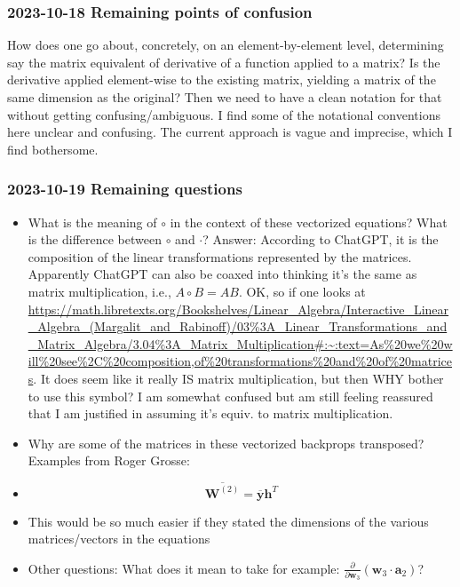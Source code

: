 \documentclass{article}
\begin{document}
\subsubsection{2023-10-18 Remaining points of confusion} How does one go about, concretely, on an element-by-element
level, determining say the matrix equivalent of derivative of a function applied to a matrix? 
Is the derivative applied element-wise to the existing matrix, yielding a matrix of the same dimension as the original?
Then we need to have a clean notation for that without getting confusing/ambiguous. I find some of the notational
conventions here unclear and confusing. The current approach is vague and imprecise, which I find bothersome.
\subsubsection{2023-10-19 Remaining questions}
\begin{itemize}
    \item What is the meaning of $\circ$ in the context of these vectorized equations? What is the difference between $\circ$ and $\cdot$?
    Answer: According to ChatGPT, it is the composition of the linear transformations represented by the matrices.
    Apparently ChatGPT can also be coaxed into thinking it's the same as matrix multiplication, i.e., $A \circ B = AB$.
    OK, so if one looks at  \url{https://math.libretexts.org/Bookshelves/Linear_Algebra/Interactive_Linear_Algebra_(Margalit_and_Rabinoff)/03%3A_Linear_Transformations_and_Matrix_Algebra/3.04%3A_Matrix_Multiplication#:~:text=As%20we%20will%20see%2C%20composition,of%20transformations%20and%20of%20matrices}.
    It does seem like it really IS matrix multiplication, but then WHY bother to use this symbol? I am somewhat confused but am still feeling reassured that 
    I am justified in assuming it's equiv. to matrix multiplication.
    \item Why are some of the matrices in these vectorized backprops transposed? Examples from Roger Grosse:
    \item \[ \overline{\bm{W}^{(2)}} = \overline{\bm{y}}\bm{h}^{T} \]
    \item This would be so much easier if they stated the dimensions of the various matrices/vectors in the equations
    \item Other questions: What does it mean to take for example: $\frac{\partial}{\partial{\bm{w}_3}} (\bm{w}_3 \cdot \bm{a}_2)$?
\end{itemize}
\end{document}
